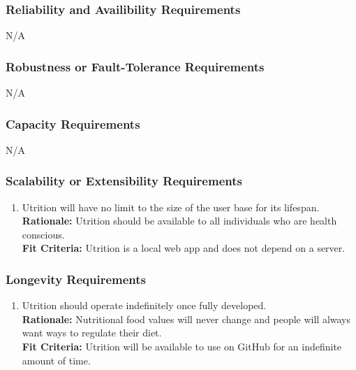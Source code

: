 \documentclass[12pt]{article}
\begin{document}
\subsubsection{Reliability and Availibility Requirements}
\hspace{1.5cm}N/A

\subsubsection{Robustness or Fault-Tolerance Requirements}
\hspace{1.5cm}N/A

\subsubsection{Capacity Requirements}

\hspace{1.5cm}N/A


\subsubsection{Scalability or Extensibility Requirements}

\begin{enumerate}[{PR}4. ] 
	\item Utrition will have no limit to the size of the user base for its lifespan. \\
	\textbf{Rationale:} Utrition should be available to all individuals who are health conscious.\\
	\textbf{Fit Criteria:} Utrition is a local web app and does not depend on a server.
\end{enumerate}

\subsubsection{Longevity Requirements}

\begin{enumerate}[{PR}5. ] 
	\item Utrition should operate indefinitely once fully developed.\\
	\textbf{Rationale:} Nutritional food values will never change and people will always want ways to regulate their diet. \\
	\textbf{Fit Criteria:} Utrition will be available to use on GitHub for an indefinite amount of time.
\end{enumerate}
\end{document}
